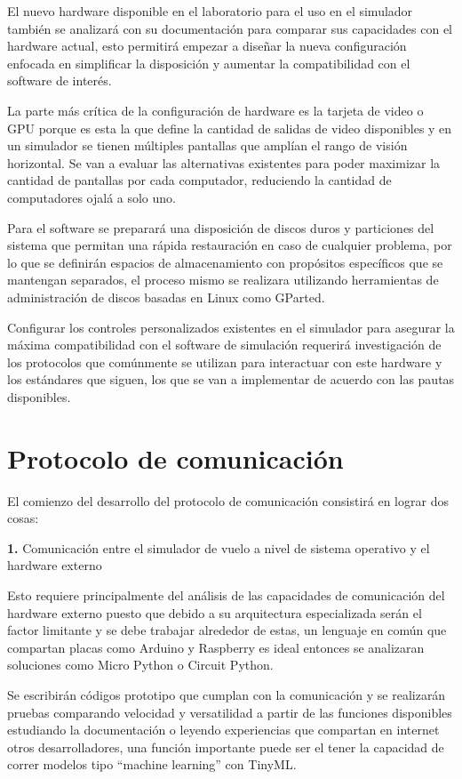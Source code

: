 \documentclass[12pt]{report}
\begin{document}
El nuevo hardware disponible en el laboratorio para el uso en el simulador también se analizará con su documentación para comparar sus capacidades con el hardware actual, esto permitirá empezar a diseñar la nueva configuración enfocada en simplificar la disposición y aumentar la compatibilidad con el software de interés.

La parte más crítica de la configuración de hardware es la tarjeta de video o GPU porque es esta la que define la cantidad de salidas de video disponibles y en un simulador se tienen múltiples pantallas que amplían el rango de visión horizontal. Se van a evaluar las alternativas existentes para poder maximizar la cantidad de pantallas por cada computador, reduciendo la cantidad de computadores ojalá a solo uno.

Para el software se preparará una disposición de discos duros y particiones del sistema que permitan una rápida restauración en caso de cualquier problema, por lo que se definirán espacios de almacenamiento con propósitos específicos que se mantengan separados, el proceso mismo se realizara utilizando herramientas de administración de discos basadas en Linux como GParted.

Configurar los controles personalizados existentes en el simulador para asegurar la máxima compatibilidad con el software de simulación requerirá investigación de los protocolos que comúnmente se utilizan para interactuar con este hardware y los estándares que siguen, los que se van a implementar de acuerdo con las pautas disponibles.

\section{Protocolo de comunicación}

El comienzo del desarrollo del protocolo de comunicación consistirá en lograr dos cosas:

\noindent
\textbf{1.} Comunicación entre el simulador de vuelo a nivel de sistema operativo y el hardware externo

Esto requiere principalmente del análisis de las capacidades de comunicación del hardware externo puesto que debido a su arquitectura especializada serán el factor limitante y se debe trabajar alrededor de estas, un lenguaje en común que compartan placas como Arduino y Raspberry es ideal entonces se analizaran soluciones como Micro Python o Circuit Python.

Se escribirán códigos prototipo que cumplan con la comunicación y se realizarán pruebas comparando velocidad y versatilidad a partir de las funciones disponibles estudiando la documentación o leyendo experiencias que compartan en internet otros desarrolladores, una función importante puede ser el tener la capacidad de correr modelos tipo “machine learning” con TinyML.
\end{document}
